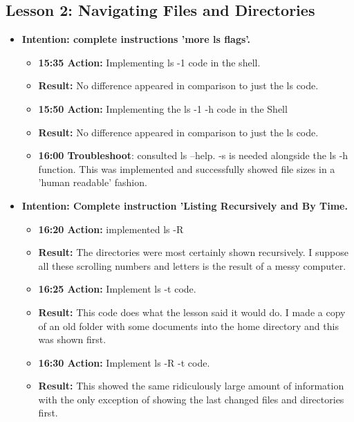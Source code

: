 \documentclass{article}
\begin{document}
\subsection{Lesson 2: Navigating Files and Directories}
\begin{itemize}
    \item{\textbf{Intention: complete instructions 'more ls flags'.}}
\begin{itemize}
   
    \item{\textbf{15:35 Action:} Implementing ls -1 code in the shell.}
    \item{\textbf{Result:} No difference appeared in comparison to just the ls code.}
    \item{\textbf{15:50 Action:} Implementing the ls -1 -h code in the Shell}
    \item{\textbf{Result:} No difference appeared in comparison to just the ls code.}
    \item{\textbf{16:00 Troubleshoot}: consulted ls --help. -s is needed alongside the ls -h function. This was implemented and successfully showed file sizes in a 'human readable' fashion.}
    \end{itemize}
    \vspace{3mm}
    


    \item{\textbf{Intention: Complete instruction 'Listing Recursively and By Time.}}
\begin{itemize}
    \item{\textbf{16:20 Action:} implemented ls -R}
    \item{\textbf{Result:} The directories were most certainly shown recursively. I suppose all these scrolling numbers and letters is the result of a messy computer.}
    \item{\textbf{16:25 Action:} Implement ls -t code.}
    \item {\textbf{Result:} This code does what the lesson said it would do. I made a copy of an old folder with some documents into the home directory and this was shown first.}
    \item{\textbf{16:30 Action:} Implement ls -R -t code.}
    \item{\textbf{Result:} This showed the same ridiculously large amount of information with the only exception of showing the last changed files and directories first.}
\end{itemize}
\end{itemize}
\end{document}
